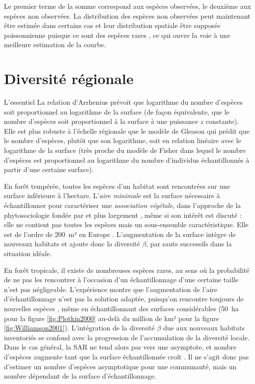 \documentclass[
  11pt,
  french,
  a4paper,
  extrafontsizes,onecolumn,openright
  ]{memoir}
\newenvironment{Summary}
  {\begin{bclogo}[logo=\bctrombone, noborder=true, couleur=lightgray!50]{L'essentiel}\parindent0pt}
  {\end{bclogo}}
\newlength{\rf}
\begin{document}
Le premier terme de la somme correspond aux espèces observées, le deuxième aux espèces non observées.
La distribution des espèces non observées peut maintenant être estimée dans certains cas \autocite{Chao2014c} et leur distribution spatiale être supposée poissonnienne puisque ce sont des espèces rares \autocite{Picard2004}, ce qui ouvre la voie à une meilleure estimation de la courbe.

\hypertarget{diversituxe9-ruxe9gionale}{%
\chapter{Diversité régionale}\label{diversituxe9-ruxe9gionale}}

\scriptsize

\begin{Summary}
La relation d'Arrhenius prévoit que logarithme du nombre d'espèces soit
proportionnel au logarithme de la surface (de façon équivalente, que le
nombre d'espèces soit proportionnel à la surface à une puissance \(z\)
constante). Elle est plus robuste à l'échelle régionale que le modèle de
Gleason qui prédit que le nombre d'espèces, plutôt que son logarithme,
soit en relation linéaire avec le logarithme de la surface (très proche
du modèle de Fisher dans lequel le nombre d'espèces est proportionnel au
logarithme du nombre d'individus échantillonnés à partir d'une certaine
surface).
\end{Summary}

\normalsize

En forêt tempérée, toutes les espèces d'un habitat sont rencontrées sur une surface inférieure à l'hectare.
L'\emph{aire minimale} est la surface nécessaire à échantillonner pour caractériser une \emph{association végétale}, dans l'approche de la phytosociologie fondée par \textcite{Braun-Blanquet1928} et plus largement \autocite{Greig-Smith1983}, même si son intérêt est discuté \autocite{McGuinness1984}: elle ne contient pas toutes les espèces mais un sous-ensemble caractéristique.
Elle est de l'ordre de 200~m² en Europe \autocite{Chytry2003}.
L'augmentation de la surface intègre de nouveaux habitats et ajoute donc la diversité \(\beta\), par sauts successifs dans la situation idéale.

En forêt tropicale, il existe de nombreuses espèces rares, au sens où la probabilité de ne pas les rencontrer à l'occasion d'un échantillonnage d'une certaine taille n'est pas négligeable.
L'expérience montre que l'augmentation de l'aire d'échantillonnage n'est pas la solution adaptée, puisqu'on rencontre toujours de nouvelles espèces \autocite{Gotelli2001}, même en échantillonnant des surfaces considérables (50~ha pour la figure \ref{fig:Plotkin2000} au-delà du million de km² pour la figure \ref{fig:Williamson2001}).
L'intégration de la diversité \(\beta\) due aux nouveaux habitats inventoriés se confond avec la progression de l'accumulation de la diversité locale.
Dans le cas général, la SAR ne tend alors pas vers une asymptote, et nombre d'espèces augmente tant que la surface échantillonnée croît \autocite{Williamson2001}.
Il ne s'agit donc pas d'estimer un nombre d'espèces asymptotique pour une communauté, mais un nombre dépendant de la surface d'échantillonnage.
\end{document}
